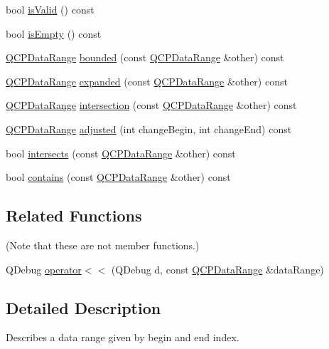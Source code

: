 \begin{DoxyCompactItemize}
\item 
bool \mbox{\hyperlink{class_q_c_p_data_range_aae53a37472212dca0a7939963e20dba0}{is\+Valid}} () const
\item 
bool \mbox{\hyperlink{class_q_c_p_data_range_ac32e53fc05d6cd2eac96b96a7265d3b8}{is\+Empty}} () const
\item 
\mbox{\hyperlink{class_q_c_p_data_range}{Q\+C\+P\+Data\+Range}} \mbox{\hyperlink{class_q_c_p_data_range_a93529421d12fdd3a8bdb2b8061936352}{bounded}} (const \mbox{\hyperlink{class_q_c_p_data_range}{Q\+C\+P\+Data\+Range}} \&other) const
\item 
\mbox{\hyperlink{class_q_c_p_data_range}{Q\+C\+P\+Data\+Range}} \mbox{\hyperlink{class_q_c_p_data_range_a36c8ad8acf177ffeb0a72c8d73030844}{expanded}} (const \mbox{\hyperlink{class_q_c_p_data_range}{Q\+C\+P\+Data\+Range}} \&other) const
\item 
\mbox{\hyperlink{class_q_c_p_data_range}{Q\+C\+P\+Data\+Range}} \mbox{\hyperlink{class_q_c_p_data_range_a84e1e03129dd52528efb4bac18d30183}{intersection}} (const \mbox{\hyperlink{class_q_c_p_data_range}{Q\+C\+P\+Data\+Range}} \&other) const
\item 
\mbox{\hyperlink{class_q_c_p_data_range}{Q\+C\+P\+Data\+Range}} \mbox{\hyperlink{class_q_c_p_data_range_a279ed36602b39607699dc5652bcaf813}{adjusted}} (int change\+Begin, int change\+End) const
\item 
bool \mbox{\hyperlink{class_q_c_p_data_range_a8a1c437f9beffd55621f48f961d7f679}{intersects}} (const \mbox{\hyperlink{class_q_c_p_data_range}{Q\+C\+P\+Data\+Range}} \&other) const
\item 
bool \mbox{\hyperlink{class_q_c_p_data_range_a13ca398776374a3160aa85433718b812}{contains}} (const \mbox{\hyperlink{class_q_c_p_data_range}{Q\+C\+P\+Data\+Range}} \&other) const
\end{DoxyCompactItemize}
\subsection*{Related Functions}
(Note that these are not member functions.) \begin{DoxyCompactItemize}
\item 
Q\+Debug \mbox{\hyperlink{class_q_c_p_data_range_a486dd7af8a090ed069672e3510e6a082}{operator$<$$<$}} (Q\+Debug d, const \mbox{\hyperlink{class_q_c_p_data_range}{Q\+C\+P\+Data\+Range}} \&data\+Range)
\end{DoxyCompactItemize}


\subsection{Detailed Description}
Describes a data range given by begin and end index. 

